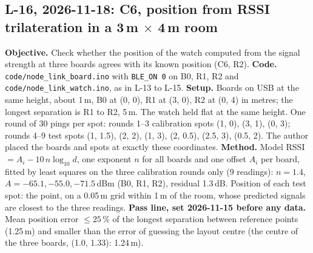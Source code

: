 \IfFileExists{IEEEtran.cls}{\documentclass[conference]{IEEEtran}}{\documentclass[10pt,twocolumn]{article}}
\begin{document}
\subsection*{L-16, 2026-11-18: C6, position from RSSI trilateration in a 3\,m $\times$ 4\,m room}
\textbf{Objective.} Check whether the position of the watch computed from the signal strength at three boards agrees with its known position (C6, R2). \textbf{Code.} \texttt{code/node\_link\_board.ino} with \texttt{BLE\_ON 0} on B0, R1, R2 and \texttt{code/node\_link\_watch.ino}, as in L-13 to L-15. \textbf{Setup.} Boards on USB at the same height, about 1\,m, B0 at (0, 0), R1 at (3, 0), R2 at (0, 4) in metres; the longest separation is R1 to R2, 5\,m. The watch held flat at the same height. One round of 30 pings per spot: rounds 1--3 calibration spots (1, 0), (3, 1), (0, 3); rounds 4--9 test spots (1, 1.5), (2, 2), (1, 3), (2, 0.5), (2.5, 3), (0.5, 2). The author placed the boards and spots at exactly these coordinates. \textbf{Method.} Model RSSI $= A_i - 10\,n\log_{10} d$, one exponent $n$ for all boards and one offset $A_i$ per board, fitted by least squares on the three calibration rounds only (9 readings): $n = 1.4$, $A = -65.1, -55.0, -71.5$\,dBm (B0, R1, R2), residual 1.3\,dB. Position of each test spot: the point, on a 0.05\,m grid within 1\,m of the room, whose predicted signals are closest to the three readings. \textbf{Pass line, set 2026-11-15 before any data.} Mean position error $\le 25\,\%$ of the longest separation between reference points (1.25\,m) and smaller than the error of guessing the layout centre (the centre of the three boards, (1.0, 1.33): 1.24\,m).
\end{document}
